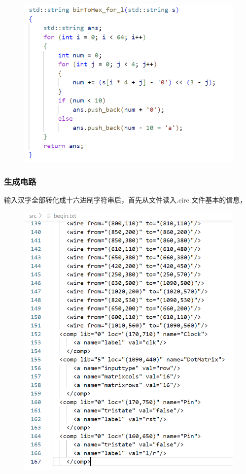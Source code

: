 \documentclass{article}
\begin{document}
	\begin{figure}[htbp]
		\centering
		\includegraphics[scale=0.8]{bfl.png}
	\end{figure}

	\subsubsection{生成电路}
	输入汉字全部转化成十六进制字符串后，首先从文件读入.circ 文件基本的信息，
	\begin{figure}[htbp]
		\centering
		\includegraphics[scale=0.7]{begin.png}
	\end{figure}
\end{document}
